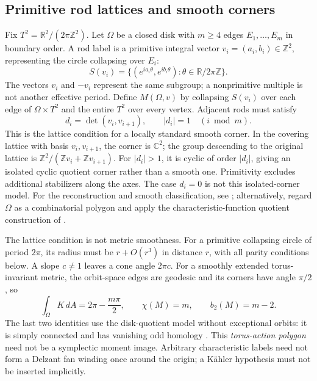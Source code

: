 \documentclass[a4paper,11pt]{article}
\numberwithin{equation}{section}
\theoremstyle{definition}
\newcommand{\R}{\mathbb R}
\newcommand{\Z}{\mathbb Z}
\begin{document}
\subsection{Primitive rod lattices and smooth corners}
Fix $T^2=\R^2/(2\pi\Z^2)$.
Let $\Omega$ be a closed disk with $m\ge4$ edges $E_1,\ldots,E_m$ in boundary order.
A rod label is a primitive integral vector $v_i=(a_i,b_i)\in\Z^2$, representing the circle collapsing over $E_i$:
\[
 S(v_i)=\{(e^{ia_i\theta},e^{ib_i\theta}):\theta\in\R/2\pi\Z\}.
\]
The vectors $v_i$ and $-v_i$ represent the same subgroup; a nonprimitive multiple is not another effective period.
Define $M(\Omega,v)$ by collapsing $S(v_i)$ over each edge of $\Omega\times T^2$ and the entire $T^2$ over every vertex.
Adjacent rods must satisfy
\begin{equation}\label{eq:toric-lattice-corner}
 d_i=\det(v_i,v_{i+1}),\qquad |d_i|=1
 \quad(i\bmod m).
\end{equation}
This is the lattice condition for a locally standard smooth corner.
In the covering lattice with basis $v_i,v_{i+1}$, the corner is $\mathbb C^2$; the group descending to the original lattice is $\Z^2/(\Z v_i+\Z v_{i+1})$.
For $|d_i|>1$, it is cyclic of order $|d_i|$, giving an isolated cyclic quotient corner rather than a smooth one.
Primitivity excludes additional stabilizers along the axes.
The case $d_i=0$ is not this isolated-corner model.
For the reconstruction and smooth classification, see \cite[\S\S3,5]{OrlikRaymond}; alternatively, regard $\Omega$ as a combinatorial polygon and apply the characteristic-function quotient construction of \cite[\S1]{DJ1991}.

The lattice condition is not metric smoothness.
For a primitive collapsing circle of period $2\pi$, its radius must be $r+O(r^3)$ in distance $r$, with all parity conditions below.
A slope $c\ne1$ leaves a cone angle $2\pi c$.
For a smoothly extended torus-invariant metric, the orbit-space edges are geodesic and its corners have angle $\pi/2$, so
\begin{equation}\label{eq:toric-gauss-bonnet}
 \int_\Omega K\,dA=2\pi-\frac{m\pi}{2},\qquad
 \chi(M)=m,\qquad b_2(M)=m-2.
\end{equation}
The last two identities use the disk-quotient model without exceptional orbits: it is simply connected and has vanishing odd homology \cite[\S3, especially Corollary 3.9]{DJ1991}.
This \emph{torus-action polygon} need not be a symplectic moment image.
Arbitrary characteristic labels need not form a Delzant fan winding once around the origin; a K\"ahler hypothesis must not be inserted implicitly.
\end{document}
